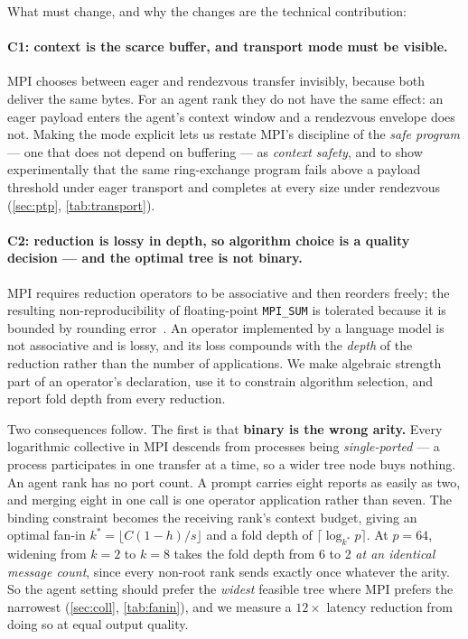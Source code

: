 \documentclass[10pt,twocolumn]{article}
\theoremstyle{definition}
\theoremstyle{plain}
\newcommand{\code}[1]{\texttt{\small #1}}
\begin{document}
What must change, and why the changes are the technical contribution:

\paragraph{C1: context is the scarce buffer, and transport mode must be visible.}
MPI chooses between eager and rendezvous transfer invisibly, because both deliver
the same bytes. For an agent rank they do not have the same effect: an eager
payload enters the agent's context window and a rendezvous envelope does not.
Making the mode explicit lets us restate MPI's discipline of the \emph{safe
program} --- one that does not depend on buffering --- as \emph{context safety},
and to show experimentally that the same ring-exchange program fails above a
payload threshold under eager transport and completes at every size under
rendezvous (\cref{sec:ptp}, \cref{tab:transport}).

\paragraph{C2: reduction is lossy in depth, so algorithm choice is a quality
decision --- and the optimal tree is not binary.} MPI requires reduction operators
to be associative and then reorders freely; the resulting non-reproducibility of
floating-point \code{MPI\_SUM} is tolerated because it is bounded by rounding
error~\cite{Demmel15,IntelCNR}. An operator implemented by a language model is not
associative and is lossy, and its loss compounds with the \emph{depth} of the
reduction rather than the number of applications. We make algebraic strength part
of an operator's declaration, use it to constrain algorithm selection, and report
fold depth from every reduction.

Two consequences follow. The first is that \textbf{binary is the wrong arity.} Every
logarithmic collective in MPI descends from processes being \emph{single-ported} --- a
process participates in one transfer at a time, so a wider tree node buys nothing. An
agent rank has no port count. A prompt carries eight reports as easily as two, and
merging eight in one call is one operator application rather than seven. The binding
constraint becomes the receiving rank's context budget, giving an optimal fan-in
$k^{*}=\lfloor C(1-h)/s\rfloor$ and a fold depth of $\lceil\log_{k^{*}} p\rceil$.
At $p=64$, widening from $k{=}2$ to $k{=}8$ takes the fold depth from 6 to 2
\emph{at an identical message count}, since every non-root rank sends exactly once
whatever the arity. So the agent setting should prefer the \emph{widest} feasible
tree where MPI prefers the narrowest (\cref{sec:coll}, \cref{tab:fanin}), and we measure
a $12\times$ latency reduction from doing so at equal output quality.
\end{document}
